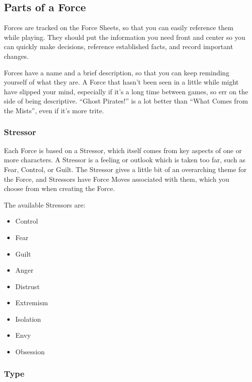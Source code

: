 \documentclass[
]{article}
\begin{document}
\hypertarget{parts-of-a-force}{%
\subsection{Parts of a Force}\label{parts-of-a-force}}

Forces are tracked on the Force Sheets, so that you can easily reference
them while playing. They should put the information you need front and
center so you can quickly make decisions, reference established facts,
and record important changes.

Forces have a name and a brief description, so that you can keep
reminding yourself of what they are. A Force that hasn't been seen in a
little while might have slipped your mind, especially if it's a long
time between games, so err on the side of being descriptive. ``Ghost
Pirates!'' is a lot better than ``What Comes from the Mists'', even if
it's more trite.

\hypertarget{stressor}{%
\subsubsection{Stressor}\label{stressor}}

Each Force is based on a Stressor, which itself comes from key aspects
of one or more characters. A Stressor is a feeling or outlook which is
taken too far, such as Fear, Control, or Guilt. The Stressor gives a
little bit of an overarching theme for the Force, and Stressors have
Force Moves associated with them, which you choose from when creating
the Force.

The available Stressors are:

\begin{itemize}
\item
  Control
\item
  Fear
\item
  Guilt
\item
  Anger
\item
  Distrust
\item
  Extremism
\item
  Isolation
\item
  Envy
\item
  Obsession
\end{itemize}

\hypertarget{type}{%
\subsubsection{Type}\label{type}}
\end{document}
